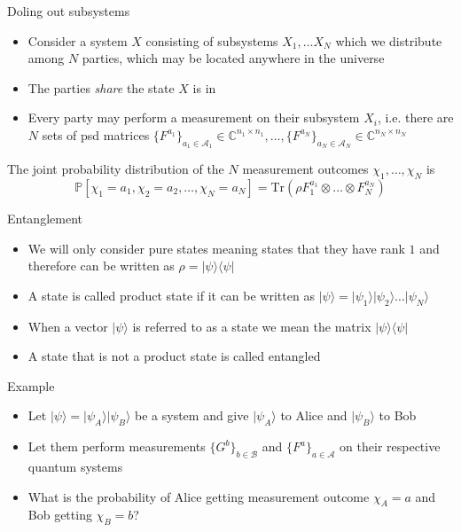 \begin{frame}{Doling out subsystems}
\begin{itemize}
    \item Consider a system $X$ consisting of subsystems $X_1, \dots X_N$ which we distribute among $N$ parties, which may be located anywhere in the universe
    \item The parties \textit{share} the state $X$ is in
    \item Every party may perform a measurement on their subsystem $X_i$, i.e. there are $N$ sets of psd matrices $\{F^{a_1} \}_{a_1 \in \mathcal{A}_1} \in \mathbb{C}^{n_1 \times n_1}, \dots , \{F^{a_N} \}_{a_N \in \mathcal{A}_N} \in \mathbb{C}^{n_N \times n_N} $
\end{itemize}
    
\begin{block}
    The joint probability distribution of the $N$ measurement outcomes $\chi_1 , \dots , \chi_N$ is 
\begin{equation*}
\mathbb{P}\left[ \chi_1 = a_1, \chi_2 = a_2, \dots , \chi_N = a_N \right] = \text{Tr}(\rho F_1^{a_1} \otimes \dots \otimes F_N^{a_N}) 
\end{equation*}
\end{block}
\end{frame}

\begin{frame}{Entanglement}
\begin{itemize}
    \item We will only consider pure states meaning states that they have rank $1$ and therefore can be written as $\rho = \vert \psi \rangle \langle \psi \vert$
    \item A state is called product state if it can be written as $\vert \psi \rangle = \vert \psi_1 \rangle \vert \psi_2 \rangle \dots \vert \psi_N \rangle$
    \item When a vector $\vert \psi \rangle$ is referred to as a state we mean the matrix $\vert \psi \rangle \langle \psi \vert$
    \item A state that is not a product state is called entangled
\end{itemize}
    
\end{frame}

\begin{frame}{Example}
    \begin{itemize}
        \item Let $\vert \psi \rangle = \vert \psi_A \rangle \vert \psi_B \rangle$ be a system and give $\vert \psi_A \rangle$ to Alice and $\vert \psi_B \rangle$ to Bob
        \item Let them perform measurements $\{ G^b \}_{b \in \mathcal{B}}$ and $\{F^a \}_{a \in \mathcal{A}}$ on their respective quantum systems
        \item What is the  probability of Alice getting measurement outcome $\chi_A = a$ and Bob getting $\chi_B = b$?
    \end{itemize}
\end{frame}

